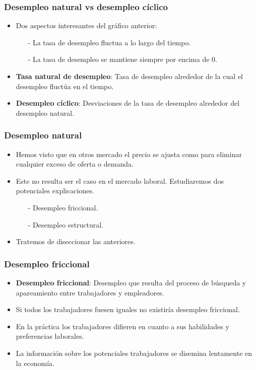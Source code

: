 \documentclass{beamer}
\begin{document}
\begin{frame}
\frametitle{Desempleo natural vs desempleo c\'iclico}
\begin{itemize}
\setlength\itemsep{1.5em}
\item Dos aspectos interesantes del gr\'afico anterior:\\
\begin{itemize}
\setlength\itemsep{0.8em}
\item[-] La tasa de desempleo fluctua a lo largo del tiempo.
\item[-] La tasa de desempleo se mantiene siempre por encima de $0$.
\end{itemize}
\item \textbf{Tasa natural de desempleo}: Tasa de desempleo alrededor de la cual el desempleo fluct\'ua en el tiempo.
\item \textbf{Desempleo c\'iclico}: Desviaciones de la tasa de desempleo alrededor del desempleo natural.
\end{itemize}
\end{frame}

\begin{frame}
\frametitle{Desempleo natural}
\begin{itemize}
\setlength\itemsep{1.5em}
\item Hemos visto que en otros mercado el precio se ajusta como para eliminar cualquier exceso de oferta o demanda.
\item Este no resulta ser el caso en el mercado laboral. Estudiaremos dos potenciales explicaciones.\\
\begin{itemize}
\setlength\itemsep{0.8em}
\item[-] Desempleo friccional.
\item[-] Desempleo estructural.
\end{itemize}
\item Tratemos de diseccionar las anteriores.
\end{itemize}
\end{frame}

\begin{frame}
\frametitle{Desempleo friccional}
\begin{itemize}
\setlength\itemsep{1.5em}
\item \textbf{Desempleo friccional}: Desempleo que resulta del proceso de b\'usqueda y apareamiento entre trabajadores y empleadores.
\item Si todos los trabajadores fuesen iguales no existir\'ia desempleo friccional.
\item En la pr\'actica los trabajadores difieren en cuanto a sus habilidades y preferencias laborales. 
\item La informaci\'on sobre los potenciales trabajadores se disemina lentamente en la econom\'ia.
\end{itemize}
\end{frame}
\end{document}

